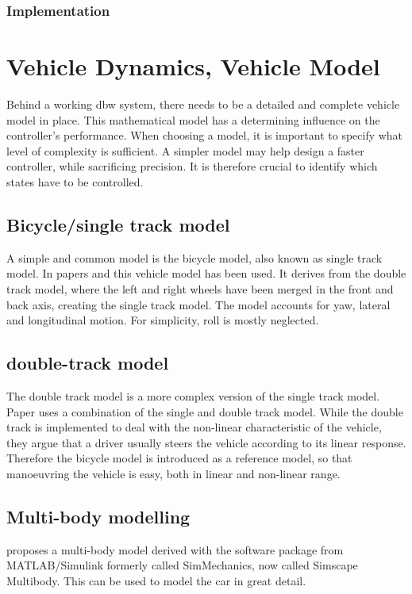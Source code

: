 \documentclass[conference]{IEEEtran}
\begin{document}
\subsubsection{Implementation}


\section{Vehicle Dynamics, Vehicle Model}

Behind a working dbw system, there needs to be a detailed and complete vehicle model in place. This mathematical model has a determining influence on the controller's performance. When choosing a model, it is important to specify what level of complexity is sufficient. A simpler model may help design a faster controller, while sacrificing precision. It is therefore crucial to identify which states have to be controlled.

\subsection{Bicycle/single track model}
A simple and common model is the bicycle model, also known as single track model. In papers \cite{Zheng} and \cite{vandersande} this vehicle model has been used. It derives from the double track model, where the left and right wheels have been merged in the front and back axis, creating the single track model. The model accounts for yaw, lateral and longitudinal motion. For simplicity, roll is mostly neglected.

\subsection{double-track model}
The double track model is a more complex version of the single track model. 
Paper \cite{Song} uses a combination of the single and double track model. While the double track is implemented to deal with the non-linear characteristic of the vehicle, they argue that a driver usually steers the vehicle according to its linear response. Therefore the bicycle model is introduced as a reference model, so that manoeuvring the vehicle is easy, both in linear and non-linear range.

\subsection{Multi-body modelling}

\cite{vandersande} proposes a multi-body model derived with the software package from MATLAB/Simulink formerly called SimMechanics, now called Simscape Multibody. This can be used to model the car in great detail. 
\end{document}
